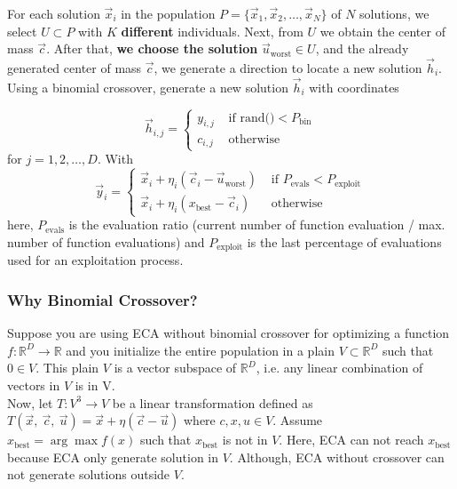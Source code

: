\documentclass[12pt,letterpape]{article}
\begin{document}
For each solution $\vec{x}_i $ in the population 
$P = \{ \vec{x}_1, \vec{x}_2, \ldots, \vec{x}_{N} \} $ of $N$ 
solutions, we select $U \subset P $ with $K$ \textbf{different} individuals. Next, 
from $U$ we obtain the center of mass $\vec{c}$. After that, \textbf{we choose the solution}
$\vec{u}_{\text{worst}} \in U$, and the already generated center of mass $\vec{c}$,
we generate a direction to locate a new solution $ \vec{h}_i$. Using a binomial 
crossover, generate a new solution $\vec{h}_{i}$ with coordinates

%
\begin{equation}
	\vec{h}_{i,j} = 
	\begin{cases}
		y_{i,j} & \text{ if rand()} < P_{\text{bin}}\\
		c_{i,j} & \text{ otherwise}
	\end{cases}
	\label{eqn:newSol}
\end{equation}
% 
for $j = 1,2,\ldots,D$. With 
%
\begin{equation}
	\vec{y}_i = 
	\begin{cases}
		\vec{x}_i + \eta _{i} ( \vec{c}_i - \vec{u}_{ \text{worst} } ) 
		       & \text{ if } P_{\text{evals}} < P_{\text{exploit}} \\
		\vec{x}_i + \eta _{i} ( x_{\text{best}} - \vec{c}_i)
		       & \text{ otherwise}
	\end{cases}
	\label{eqn:vcu2}
\end{equation}
%
here, $ P_{\text{evals}}$ is the evaluation ratio (current number of function evaluation / max.
number of function evaluations) and  $P_{\text{exploit}}$ is the last percentage of
evaluations used for an exploitation process.\\
%


\subsubsection{Why Binomial Crossover?} %
\label{sub:why_binomial_crossover_}

Suppose you are using ECA without binomial crossover for optimizing a function 
$f:\mathbb{R}^D \to \mathbb{R}$ and you initialize the entire population in a 
plain $V \subset \mathbb{R}^D $ such that $0 \in V$. This plain $V$ is a vector 
subspace of $\mathbb{R}^D$, i.e. any linear combination of vectors in $V$ is in V.\\

Now, let $T:V^3 \to V$ be a linear transformation defined as 
$ T(\vec{x},\ \vec{c},\ \vec{u}) = \vec{x} + \eta ( \vec{c} - \vec{u} )$ where 
$c,x,u \in V$. Assume $x_\text{best} = \arg \max f(x)$ such that $x_\text{best} $
is not in $V$. Here, ECA can not reach $x_\text{best}$ because ECA only generate
solution in $V$. Although, ECA without crossover can not generate solutions outside $V$.
\end{document}
